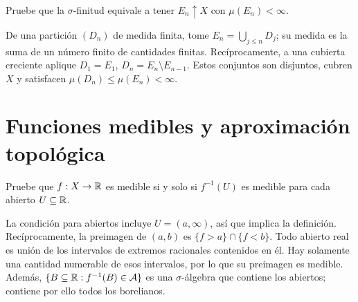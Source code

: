 \begin{ejercicio}\label{ej:v2-l02-8}
Pruebe que la $\sigma$-finitud equivale a tener $E_n\uparrow X$ con $\mu(E_n)<\infty$.
\end{ejercicio}
\begin{solucion}
De una partición $(D_n)$ de medida finita, tome $E_n=\bigcup_{j\le n}D_j$; su medida es la suma de un número finito de cantidades finitas. Recíprocamente, a una cubierta creciente aplique $D_1=E_1$, $D_n=E_n\setminus E_{n-1}$. Estos conjuntos son disjuntos, cubren $X$ y satisfacen $\mu(D_n)\le\mu(E_n)<\infty$.
\end{solucion}

\chapter{Funciones medibles y aproximación topológica}

\begin{ejercicio}\label{ej:v2-l03-1}
Pruebe que $f:X\to\mathbb R$ es medible si y solo si $f^{-1}(U)$ es medible para cada abierto $U\subseteq\mathbb R$.
\end{ejercicio}
\begin{solucion}
La condición para abiertos incluye $U=(a,\infty)$, así que implica la definición. Recíprocamente, la preimagen de $(a,b)$ es $\{f>a\}\cap\{f<b\}$. Todo abierto real es unión de los intervalos de extremos racionales contenidos en él. Hay solamente una cantidad numerable de esos intervalos, por lo que su preimagen es medible. Además, $\{B\subseteq\mathbb R:f^{-1}(B)\in\mathcal A\}$ es una $\sigma$-álgebra que contiene los abiertos; contiene por ello todos los borelianos.
\end{solucion}

